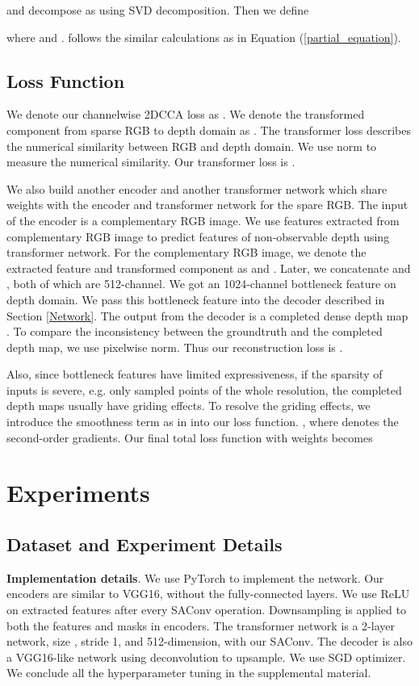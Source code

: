 \documentclass{article}
\begin{document}
and decompose  as  using SVD decomposition. Then we define

where  and .  follows the similar calculations as  in Equation (\ref{partial_equation}). 

\subsection{Loss Function}
We denote our channelwise 2DCCA loss as . We denote the transformed component from sparse RGB to depth domain as . The transformer loss describes the numerical similarity between RGB and depth domain. We use  norm to measure the numerical similarity. Our transformer loss is .

We also build another encoder and another transformer network which share weights with the encoder and transformer network for the spare RGB. The input of the encoder is a complementary RGB image. We use features extracted from complementary RGB image to predict features of non-observable depth using transformer network. For the complementary RGB image, we denote the extracted feature and transformed component as  and . Later, we concatenate  and , both of which are 512-channel. We got an 1024-channel bottleneck feature on depth domain. We pass this bottleneck feature into the decoder described in Section \ref{Network}. The output from the decoder is a completed dense depth map . To compare the inconsistency between the groundtruth  and the completed depth map, we use pixelwise  norm. Thus our reconstruction loss is .

Also, since bottleneck features have limited expressiveness, if the sparsity of inputs is severe, e.g. only  sampled points of the whole resolution, the completed depth maps usually have griding effects. To resolve the griding effects, we introduce the smoothness term as in \cite{zhou2017unsupervised} into our loss function. , where  denotes the second-order gradients. 
Our final total loss function with weights becomes


\section{Experiments}
\label{Experiments}
\subsection{Dataset and Experiment Details}
\label{Dataset and Experiment Details}

\textbf{Implementation details}. We use PyTorch to implement the network. Our encoders are similar to VGG16, without the fully-connected layers. We use ReLU on extracted features after every SAConv operation. Downsampling is applied to both the features and masks in encoders. The transformer network is a 2-layer network, size , stride 1, and 512-dimension, with our SAConv. The decoder is also a VGG16-like network using deconvolution to upsample. We use SGD optimizer. We conclude all the hyperparameter tuning in the supplemental material.
\end{document}
